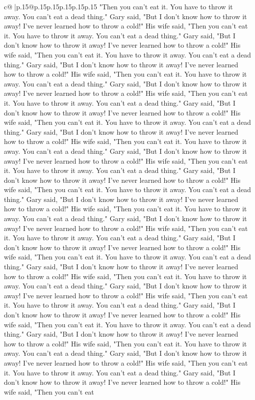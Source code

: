 \documentclass{article}
\begin{document}
{\begin{supertabular}{c@{$\;$}|p{.15\linewidth}@{}p{.15\linewidth}p{.15\linewidth}p{.15\linewidth}p{.15\linewidth}p{.15\linewidth}}
{{{"Then you can't eat it. You have to throw it away. You can't eat a dead thing." Gary said, "But I don't know how to throw it away! I've never learned how to throw a cold!" His wife said, "Then you can't eat it. You have to throw it away. You can't eat a dead thing." Gary said, "But I don't know how to throw it away! I've never learned how to throw a cold!" His wife said, "Then you can't eat it. You have to throw it away. You can't eat a dead thing." Gary said, "But I don't know how to throw it away! I've never learned how to throw a cold!" His wife said, "Then you can't eat it. You have to throw it away. You can't eat a dead thing." Gary said, "But I don't know how to throw it away! I've never learned how to throw a cold!" His wife said, "Then you can't eat it. You have to throw it away. You can't eat a dead thing." Gary said, "But I don't know how to throw it away! I've never learned how to throw a cold!" His wife said, "Then you can't eat it. You have to throw it away. You can't eat a dead thing." Gary said, "But I don't know how to throw it away! I've never learned how to throw a cold!" His wife said, "Then you can't eat it. You have to throw it away. You can't eat a dead thing." Gary said, "But I don't know how to throw it away! I've never learned how to throw a cold!" His wife said, "Then you can't eat it. You have to throw it away. You can't eat a dead thing." Gary said, "But I don't know how to throw it away! I've never learned how to throw a cold!" His wife said, "Then you can't eat it. You have to throw it away. You can't eat a dead thing." Gary said, "But I don't know how to throw it away! I've never learned how to throw a cold!" His wife said, "Then you can't eat it. You have to throw it away. You can't eat a dead thing." Gary said, "But I don't know how to throw it away! I've never learned how to throw a cold!" His wife said, "Then you can't eat it. You have to throw it away. You can't eat a dead thing." Gary said, "But I don't know how to throw it away! I've never learned how to throw a cold!" His wife said, "Then you can't eat it. You have to throw it away. You can't eat a dead thing." Gary said, "But I don't know how to throw it away! I've never learned how to throw a cold!" His wife said, "Then you can't eat it. You have to throw it away. You can't eat a dead thing." Gary said, "But I don't know how to throw it away! I've never learned how to throw a cold!" His wife said, "Then you can't eat it. You have to throw it away. You can't eat a dead thing." Gary said, "But I don't know how to throw it away! I've never learned how to throw a cold!" His wife said, "Then you can't eat it. You have to throw it away. You can't eat a dead thing." Gary said, "But I don't know how to throw it away! I've never learned how to throw a cold!" His wife said, "Then you can't eat it. You have to throw it away. You can't eat a dead thing." Gary said, "But I don't know how to throw it away! I've never learned how to throw a cold!" His wife said, "Then you can't eat it. You have to throw it away. You can't eat a dead thing." Gary said, "But I don't know how to throw it away! I've never learned how to throw a cold!" His wife said, "Then you can't eat }}}
\end{supertabular}}
\end{document}
